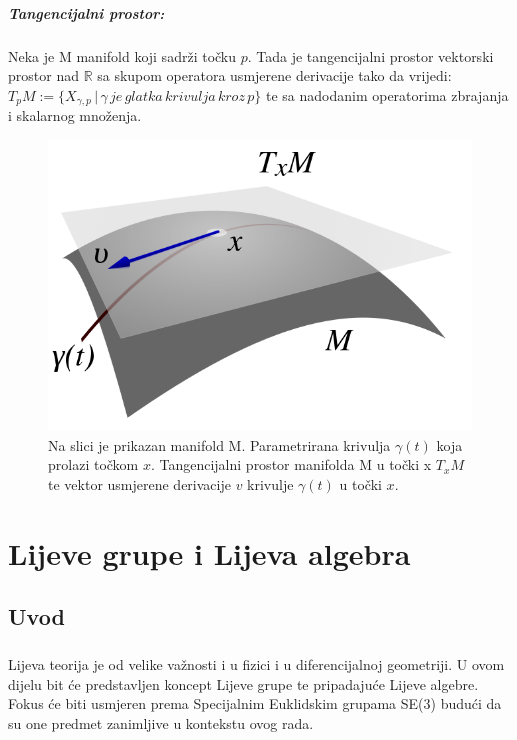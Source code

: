 \documentclass[times, utf8, diplomski]{fer}
\begin{document}
	\paragraph{Tangencijalni prostor:} Neka je M manifold koji sadrži točku $p$. Tada je tangencijalni prostor vektorski prostor nad $\mathbb{R}$ sa skupom operatora usmjerene derivacije tako da vrijedi: \\
	$T_p M := \{ X_{\gamma, p} \, | \, \gamma \, je \, glatka \, krivulja \, kroz \, p\}$ te sa nadodanim operatorima zbrajanja i skalarnog množenja.
	
	\begin{figure}[h!]
		\includegraphics[width=\textwidth]{txm.png}
		\caption{Na slici je prikazan manifold M. Parametrirana krivulja $\gamma(t)$ koja prolazi točkom $x$. Tangencijalni prostor manifolda M u točki x $T_x M$ te vektor usmjerene derivacije $v$ krivulje $\gamma (t)$ u točki $x$. }
	\end{figure}
	
\chapter{Lijeve grupe i Lijeva algebra}

\section{Uvod}

	\paragraph{}Lijeva teorija je od velike važnosti i u fizici i u diferencijalnoj geometriji. U ovom dijelu bit će predstavljen koncept Lijeve grupe te pripadajuće Lijeve algebre. Fokus će biti usmjeren prema Specijalnim Euklidskim grupama SE(3) budući da su one predmet zanimljive u kontekstu ovog rada.
	
\end{document}
